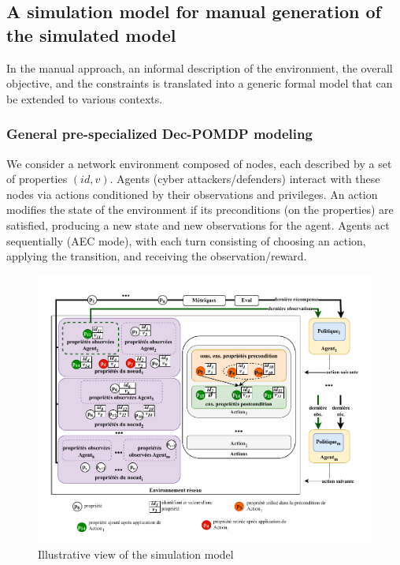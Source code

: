 \subsection {A simulation model for manual generation of the simulated model}

In the manual approach, an informal description of the environment, the overall objective, and the constraints is translated into a generic formal model that can be extended to various contexts.

\subsubsection{General pre-specialized Dec-POMDP modeling}

We consider a network environment composed of nodes, each described by a set of properties $(id, v)$. Agents (cyber attackers/defenders) interact with these nodes via actions conditioned by their observations and privileges. An action modifies the state of the environment if its preconditions (on the properties) are satisfied, producing a new state and new observations for the agent. Agents act sequentially (AEC mode), with each turn consisting of choosing an action, applying the transition, and receiving the observation/reward.

\begin{figure}[h!]
  \centering
  \includegraphics[trim=0.7cm 0.6cm 0.7cm 1cm, clip,width=1\textwidth]{figures/model_example_illustration.pdf}
  \caption{Illustrative view of the simulation model}
  \label{fig:model_example_illustration}
\end{figure}

